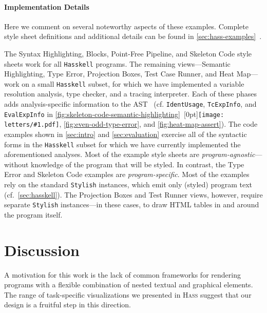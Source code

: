 \documentclass[acmsmall, screen]{acmart}
\newcommand{\parahead}[1]
  {\paragraph{\textbf{#1}}}
\newcommand{\refAppendixHassExamples}
  {\autoref{sec:hass-examples}~\cite{Hass}}
\newcommand{\hass}
{\textsc{Hass}}
\newcommand{\figBubble}[1]{\raisebox{-0.03in}[0pt]{\texttt{[image: letters/\#1.pdf]}}}
\newcommand{\refBubble}[1]
  {~\figBubble{#1}}
\begin{document}
\parahead{Implementation Details}



Here we comment on several noteworthy aspects of these examples.
Complete style sheet definitions and additional details can be found in \refAppendixHassExamples{}. 

The Syntax Highlighting, Blocks, Point-Free Pipeline, and Skeleton Code style sheets work for all \texttt{Hasskell} programs.
The remaining views---Semantic Highlighting, Type Error, Projection Boxes, Test Case Runner, and Heat Map---work on a small \texttt{Hasskell} subset, for which we have implemented a variable resolution analysis, type checker, and a tracing interpreter.
Each of these phases adds analysis-specific information to the AST~\citep{Najd2016} (cf. \texttt{IdentUsage}, \texttt{TcExpInfo}, and \texttt{EvalExpInfo} in \autoref{fig:skeleton-code-semantic-highlighting}\refBubble{b}, \autoref{fig:even-odd-type-error}, and \autoref{fig:heat-map-assert}).
The code examples shown in \autoref{sec:intro} and \autoref{sec:evaluation} exercise all of the syntactic forms in the \texttt{Hasskell} subset for which we have currently implemented the aforementioned analyses.
Most of the example style sheets are \textit{program-agnostic}---without knowledge of the program that will be styled.
In contrast, the Type Error and Skeleton Code examples are \textit{program-specific}. Most of the examples rely on the standard \texttt{Stylish} instances, which emit only (styled) program text (cf.~\autoref{sec:hasskell}).
The Projection Boxes and Test Runner views, however, require separate \texttt{Stylish} instances---in these cases, to draw HTML tables in and around the program itself.
 
\section{Discussion}
\label{sec:discussion}















A motivation for this work is the lack of common frameworks for rendering programs with a flexible combination of nested textual and graphical elements.
The range of task-specific visualizations we presented in \hass{} suggest that our design is a fruitful step in this direction.
\end{document}
